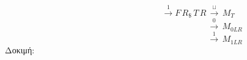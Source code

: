 \reducevspace\reducevspace\reducevspace\reducevspace\reducevspace\reducevspace\reducevspace\reducevspace\reducevspace
\reducevspace\reducevspace\reducevspace\reducevspace\reducevspace\reducevspace\reducevspace\reducevspace\reducevspace
\reducevspace\reducevspace\reducevspace\reducevspace\reducevspace\reducevspace\reducevspace\reducevspace\reducevspace
\reducevspace\reducevspace\reducevspace\reducevspace\reducevspace\reducevspace\reducevspace\reducevspace\reducevspace
\[\qquad\qquad\qquad\qquad\quad\, \xrightarrow{1} F\, R_\$\, T\, R\, \xrightarrow{\sqcup}\, M_T
\]
\reducevspace\reducevspace\reducevspace\reducevspace\reducevspace\reducevspace\reducevspace
\reducevspace\reducevspace\reducevspace\reducevspace\reducevspace\reducevspace\reducevspace
\reducevspace\reducevspace\reducevspace\reducevspace\reducevspace\reducevspace\reducevspace
\reducevspace\reducevspace\reducevspace\reducevspace\reducevspace\reducevspace\reducevspace
\[\qquad\qquad\qquad\qquad\qquad\qquad\qquad\quad\;\, \xrightarrow{0}\, M_{0LR}\]
\reducevspace\reducevspace\reducevspace\reducevspace\reducevspace\reducevspace\reducevspace
\reducevspace\reducevspace\reducevspace\reducevspace\reducevspace\reducevspace\reducevspace
\reducevspace\reducevspace\reducevspace\reducevspace\reducevspace\reducevspace\reducevspace
\reducevspace\reducevspace\reducevspace\reducevspace\reducevspace\reducevspace\reducevspace
\[\qquad\qquad\qquad\qquad\qquad\qquad\qquad\quad\;\, \xrightarrow{1}\, M_{1LR}\]
\reducevspace\reducevspace\reducevspace\reducevspace\reducevspace\reducevspace\reducevspace\reducevspace\reducevspace
Δοκιμή:
\reducevspace\reducevspace\reducevspace\reducevspace\reducevspace\reducevspace\reducevspace\reducevspace\reducevspace
